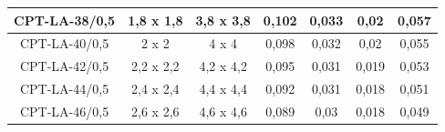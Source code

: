 \begin{table}[H]
\begin{tabular}{|c|c|c|c|c|c|c|}
CPT-LA-38/0,5                                                                 & 1,8 x 1,8                                                                                          & 3,8 x 3,8                                                                            & 0,102                                                                      & 0,033                                                                           & 0,02                                                                              & 0,057                                                                             \\ \hline
CPT-LA-40/0,5                                                                 & 2 x 2                                                                                              & 4 x 4                                                                                & 0,098                                                                      & 0,032                                                                           & 0,02                                                                              & 0,055                                                                             \\ \hline
CPT-LA-42/0,5                                                                 & 2,2 x 2,2                                                                                          & 4,2 x 4,2                                                                            & 0,095                                                                      & 0,031                                                                           & 0,019                                                                             & 0,053                                                                             \\ \hline
CPT-LA-44/0,5                                                                 & 2,4 x 2,4                                                                                          & 4,4 x 4,4                                                                            & 0,092                                                                      & 0,031                                                                           & 0,018                                                                             & 0,051                                                                             \\ \hline
CPT-LA-46/0,5                                                                 & 2,6 x 2,6                                                                                          & 4,6 x 4,6                                                                            & 0,089                                                                      & 0,03                                                                            & 0,018                                                                             & 0,049                                                                             \\ \hline

\end{tabular}
\end{table}

